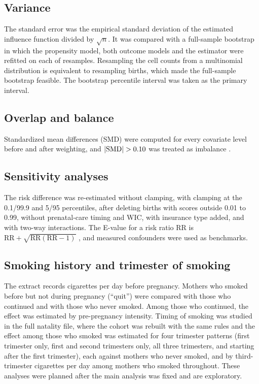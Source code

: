 \documentclass[11pt,letterpaper]{article}
\begin{document}
\subsection*{Variance}
The standard error was the empirical standard deviation of the estimated influence function divided by $\sqrt n$. It was compared with a full-sample bootstrap in which the propensity model, both outcome models and the estimator were refitted on each of \BootB{} resamples. Resampling the cell counts from a multinomial distribution is equivalent to resampling births, which made the full-sample bootstrap feasible. The bootstrap percentile interval was taken as the primary interval.

\subsection*{Overlap and balance}
Standardized mean differences (SMD) were computed for every covariate level before and after weighting, and $|{\rm SMD}|>0.10$ was treated as imbalance \cite{austin2015}.

\subsection*{Sensitivity analyses}
The risk difference was re-estimated without clamping, with clamping at the 0.1/99.9 and 5/95 percentiles, after deleting births with scores outside 0.01 to 0.99, without prenatal-care timing and WIC, with insurance type added, and with two-way interactions. The E-value for a risk ratio $\mathrm{RR}$ is $\mathrm{RR}+\sqrt{\mathrm{RR}(\mathrm{RR}-1)}$ \cite{vdw2017}, and measured confounders were used as benchmarks.

\subsection*{Smoking history and trimester of smoking}
The extract records cigarettes per day before pregnancy. Mothers who smoked before but not during pregnancy (``quit'') were compared with those who continued and with those who never smoked. Among those who continued, the effect was estimated by pre-pregnancy intensity. Timing of smoking was studied in the full natality file, where the cohort was rebuilt with the same rules and the effect among those who smoked was estimated for four trimester patterns (first trimester only, first and second trimesters only, all three trimesters, and starting after the first trimester), each against mothers who never smoked, and by third-trimester cigarettes per day among mothers who smoked throughout. These analyses were planned after the main analysis was fixed and are exploratory.
\end{document}
